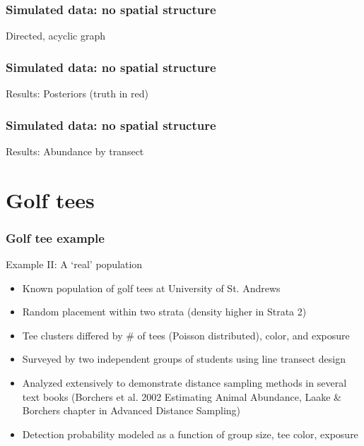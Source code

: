 \documentclass[serif,mathserif]{beamer}
\begin{document}
\begin{frame}
  \frametitle{Simulated data: no spatial structure}
  Directed, acyclic graph
\end{frame}

\begin{frame}
  \frametitle{Simulated data: no spatial structure}
  Results: Posteriors (truth in red)
\end{frame}

\begin{frame}
  \frametitle{Simulated data: no spatial structure}
  Results: Abundance by transect
\end{frame}

\section{Golf tees}
\begin{frame}
  \frametitle{Golf tee example}
  Example II: A `real' population
  \begin{itemize}
  \item Known population of golf tees at University of St. Andrews
  \item Random placement within two strata (density higher in Strata 2)
  \item Tee clusters differed by \# of tees (Poisson distributed), color, and exposure
  \item Surveyed by two independent groups of students using line transect design
  \item Analyzed extensively to demonstrate distance sampling methods in several text books (Borchers et al. 2002 Estimating Animal Abundance, Laake \& Borchers chapter in Advanced Distance Sampling)
  \item Detection probability modeled as a function of group size, tee color, exposure
  \end{itemize}
\end{frame}
\end{document}
